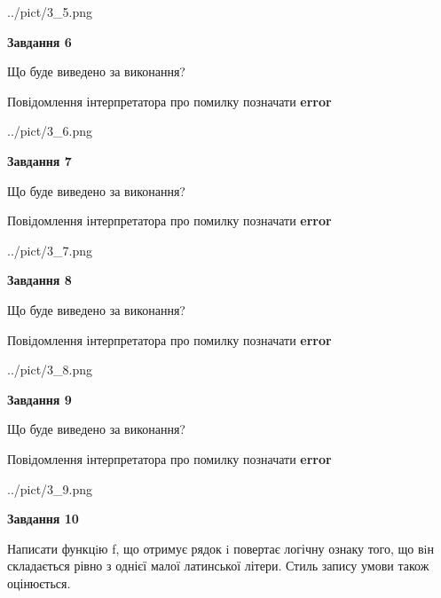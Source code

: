 \documentclass[12pt, ukrainian]{article}
\begin{document}
{\begin {large}
\begin{center}
	{../pict/3_5.png}
\end{center}
\newpage

{\begin {center}\textbf{Завдання 6}\end {center}}\par
Що буде виведено за виконання? \par
Повідомлення інтерпретатора про помилку позначати \textbf{error}

\begin{center}
	{../pict/3_6.png}
\end{center}
\newpage

{\begin {center}\textbf{Завдання 7}\end {center}}\par
Що буде виведено за виконання? \par
Повідомлення інтерпретатора про помилку позначати \textbf{error}

\begin{center}
	{../pict/3_7.png}
\end{center}
\newpage

{\begin {center}\textbf{Завдання 8}\end {center}}\par
Що буде виведено за виконання? \par
Повідомлення інтерпретатора про помилку позначати \textbf{error}

\begin{center}
	{../pict/3_8.png}
\end{center}
\newpage

{\begin {center}\textbf{Завдання 9}\end {center}}\par
Що буде виведено за виконання? \par
Повідомлення інтерпретатора про помилку позначати \textbf{error}

\begin{center}
	{../pict/3_9.png}
\end{center}
\newpage

{\begin {center}\textbf{Завдання 10}\end {center}}\par

Написати функцiю f, що отримує рядок i повертає логічну ознаку того, що вiн складається рівно з однієї малої латинської літери. Стиль запису умови також оцінюється.\par
\newpage

\end {large}}
\end{document}
